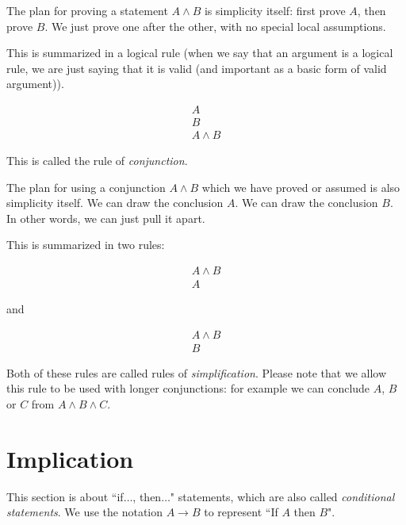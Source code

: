 \documentclass[12pt]{article}
\begin{document}
The plan for proving a statement $A \wedge B$ is simplicity itself:  first prove $A$, then prove $B$.  We just prove one after the other, with no special local assumptions.

This is summarized in a logical rule (when we say that an argument is a logical rule, we are just saying that it is valid (and important as a basic form of valid argument)).

$$\begin{array}{c}

A \\

B \\ \hline

A \wedge B

\end{array}$$

This is called the rule of {\em conjunction\/}.

The plan for using a conjunction $A \wedge B$ which we have proved or assumed is also simplicity itself.  We can draw the conclusion $A$.  We can draw the conclusion $B$.
In other words, we can just pull it apart.

This is summarized in two rules:

$$\begin{array}{c}

A \wedge B \\ \hline

A


\end{array}$$

and

$$\begin{array}{c}

A \wedge B \\ \hline

B


\end{array}$$

Both of these rules are called rules of {\em simplification}.   Please note that we allow this rule to be used with longer conjunctions:  for example we can conclude $A$, $B$ or $C$ from $A \wedge B \wedge C$.

\newpage

\section{Implication}

This section is about ``if$\ldots$, then$\ldots$" statements, which are also called {\em conditional statements\/}.  We use the notation $A \rightarrow B$ to represent
``If $A$ then $B$".
\end{document}
